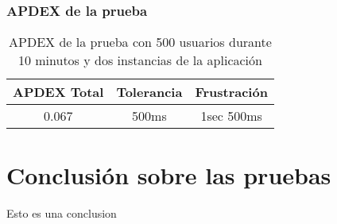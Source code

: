 \subsubsection{APDEX de la prueba}
\begin{table}[]
    \centering
    \makegapedcells
    \begin{tabular}{|c|c|c}
    \hline
    APDEX Total & Tolerancia & Frustración\\ \hline
    0.067 & 500ms & 1sec 500ms \\ \hline
    \end{tabular}
    \caption{APDEX de la prueba con 500 usuarios durante 10 minutos y dos instancias de la aplicación}
    \label{tab:tabla_planes}
\end{table}
\break
\section{Conclusión sobre las pruebas}

Esto es una conclusion

